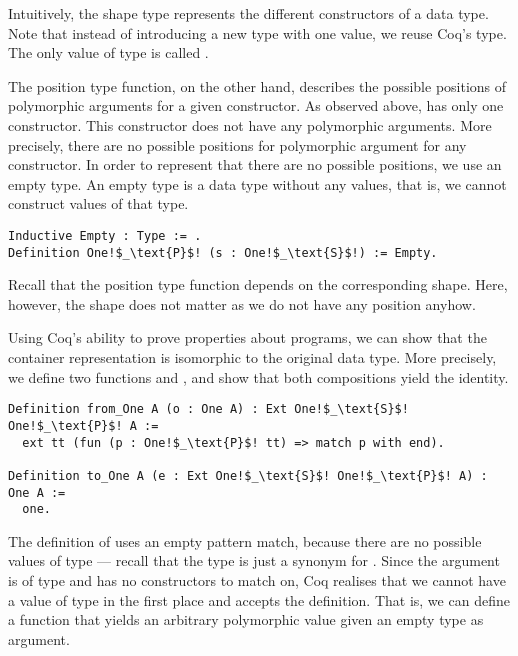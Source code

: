 Intuitively, the shape type represents the different constructors of a data type.
Note that instead of introducing a new type with one value, we reuse Coq's  type.
The only value of type  is called .

The position type function, on the other hand, describes the possible positions of polymorphic arguments for a given constructor.
As observed above,  has only one constructor.
This constructor  does not have any polymorphic arguments.
More precisely, there are no possible positions for polymorphic argument for any constructor.
In order to represent that there are no possible positions, we use an empty type.
An empty type is a data type without any values, that is, we cannot construct values of that type.

\begin{verbatim}
Inductive Empty : Type := .
Definition One!$_\text{P}$! (s : One!$_\text{S}$!) := Empty.
\end{verbatim}
\label{code:one_container}

Recall that the position type function depends on the corresponding shape.
Here, however, the shape does not matter as we do not have any position anyhow.

Using Coq's ability to prove properties about programs, we can show that the container representation is isomorphic to the original data type.
More precisely, we define two functions  and , and show that both compositions yield the identity.

\begin{verbatim}
Definition from_One A (o : One A) : Ext One!$_\text{S}$! One!$_\text{P}$! A :=
  ext tt (fun (p : One!$_\text{P}$! tt) => match p with end).

Definition to_One A (e : Ext One!$_\text{S}$! One!$_\text{P}$! A) : One A :=
  one.
\end{verbatim}

The definition of  uses an empty pattern match, because there are no possible values of type  --- recall that the type is just a synonym for .
Since the argument  is of type  and  has no constructors to match on, Coq realises that we cannot have a value of type  in the first place and accepts the definition.
That is, we can define a function that yields an arbitrary polymorphic value given an empty type as argument.

